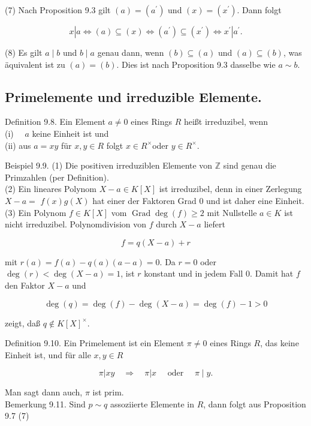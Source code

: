 \documentclass[10pt, letterpaper]{article}
\begin{document}
(7) Nach Proposition 9.3 gilt $(a)=\left(a^{\prime}\right)$ und $(x)=\left(x^{\prime}\right)$. Dann folgt

$$
x\left|a \Longleftrightarrow(a) \subseteq(x) \Longleftrightarrow\left(a^{\prime}\right) \subseteq\left(x^{\prime}\right) \Longleftrightarrow x^{\prime}\right| a^{\prime} .
$$

(8) Es gilt $a \mid b$ und $b \mid a$ genau dann, wenn $(b) \subseteq(a)$ und $(a) \subseteq(b)$, was äquivalent ist zu $(a)=(b)$. Dies ist nach Proposition 9.3 dasselbe wie $a \sim b$.

\subsection*{Primelemente und irreduzible Elemente.}
Definition 9.8. Ein Element $a \neq 0$ eines Rings $R$ heißt irreduzibel, wenn\\
(i) $\quad a$ keine Einheit ist und\\
(ii) aus $a=x y$ für $x, y \in R$ folgt $x \in R^{\times}$oder $y \in R^{\times}$.

Beispiel 9.9. (1) Die positiven irreduziblen Elemente von $\mathbb{Z}$ sind genau die Primzahlen (per Definition).\\
(2) Ein lineares Polynom $X-a \in K[X]$ ist irreduzibel, denn in einer Zerlegung $X-a=$ $f(x) g(X)$ hat einer der Faktoren Grad 0 und ist daher eine Einheit.\\
(3) Ein Polynom $f \in K[X]$ vom $\operatorname{Grad} \operatorname{deg}(f) \geq 2$ mit Nullstelle $a \in K$ ist nicht irreduzibel. Polynomdivision von $f$ durch $X-a$ liefert

$$
f=q(X-a)+r
$$

mit $r(a)=f(a)-q(a)(a-a)=0$. Da $r=0$ oder $\operatorname{deg}(r)<\operatorname{deg}(X-a)=1$, ist $r$ konstant und in jedem Fall 0. Damit hat $f$ den Faktor $X-a$ und

$$
\operatorname{deg}(q)=\operatorname{deg}(f)-\operatorname{deg}(X-a)=\operatorname{deg}(f)-1>0
$$

zeigt, daß $q \notin K[X]^{\times}$.

Definition 9.10. Ein Primelement ist ein Element $\pi \neq 0$ eines Rings $R$, das keine Einheit ist, und für alle $x, y \in R$

$$
\pi|x y \quad \Longrightarrow \quad \pi| x \quad \text { oder } \quad \pi \mid y .
$$

Man sagt dann auch, $\pi$ ist prim.\\
Bemerkung 9.11. Sind $p \sim q$ assoziierte Elemente in $R$, dann folgt aus Proposition 9.7 (7)
\end{document}
